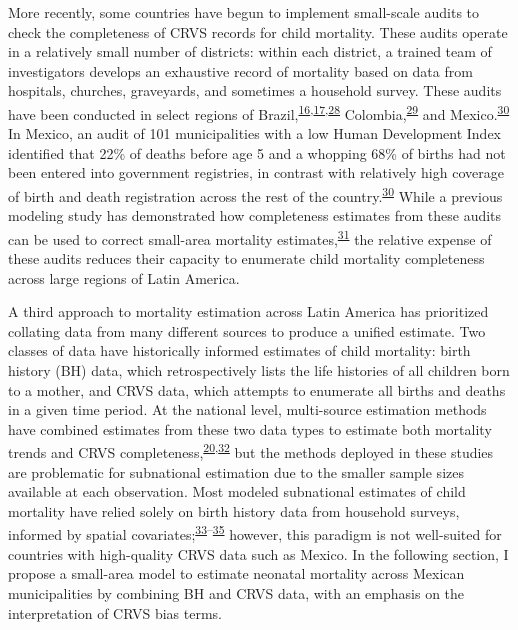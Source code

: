 \documentclass[
]{article}
\begin{document}
More recently, some countries have begun to implement small-scale audits to check the completeness of CRVS records for child mortality. These audits operate in a relatively small number of districts: within each district, a trained team of investigators develops an exhaustive record of mortality based on data from hospitals, churches, graveyards, and sometimes a household survey. These audits have been conducted in select regions of Brazil,\textsuperscript{\protect\hyperlink{ref-DeFrias2013}{16},\protect\hyperlink{ref-Szwarcwald2014}{17},\protect\hyperlink{ref-DeAlmeida2017a}{28}} Colombia,\textsuperscript{\protect\hyperlink{ref-NationalAdminstrativeDepartmentofStatisticsDANE2006}{29}} and Mexico.\textsuperscript{\protect\hyperlink{ref-Hernandez2012}{30}} In Mexico, an audit of 101 municipalities with a low Human Development Index identified that 22\% of deaths before age 5 and a whopping 68\% of births had not been entered into government registries, in contrast with relatively high coverage of birth and death registration across the rest of the country.\textsuperscript{\protect\hyperlink{ref-Hernandez2012}{30}} While a previous modeling study has demonstrated how completeness estimates from these audits can be used to correct small-area mortality estimates,\textsuperscript{\protect\hyperlink{ref-Schmertmann2018a}{31}} the relative expense of these audits reduces their capacity to enumerate child mortality completeness across large regions of Latin America.

A third approach to mortality estimation across Latin America has prioritized collating data from many different sources to produce a unified estimate. Two classes of data have historically informed estimates of child mortality: birth history (BH) data, which retrospectively lists the life histories of all children born to a mother, and CRVS data, which attempts to enumerate all births and deaths in a given time period. At the national level, multi-source estimation methods have combined estimates from these two data types to estimate both mortality trends and CRVS completeness,\textsuperscript{\protect\hyperlink{ref-Dicker2018}{20},\protect\hyperlink{ref-Fisker2019}{32}} but the methods deployed in these studies are problematic for subnational estimation due to the smaller sample sizes available at each observation. Most modeled subnational estimates of child mortality have relied solely on birth history data from household surveys, informed by spatial covariates;\textsuperscript{\protect\hyperlink{ref-Golding2017}{33}--\protect\hyperlink{ref-Wakefield2019}{35}} however, this paradigm is not well-suited for countries with high-quality CRVS data such as Mexico. In the following section, I propose a small-area model to estimate neonatal mortality across Mexican municipalities by combining BH and CRVS data, with an emphasis on the interpretation of CRVS bias terms.
\end{document}
